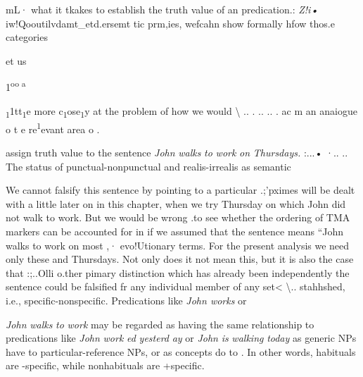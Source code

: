 mL· what it tkakes to establish the truth value of an  predication.: \textit{Z}\textit{!i•} iw!Qooutilvdamt\_etd.ersemt tic prm,ies, wefcahn show formally hfow thos.e categories

et us

1\textsuperscript{oo a}

\textsubscript{1}1tt\textsubscript{1}e more c\textsubscript{1}ose\textsubscript{1}y at the problem of how we would {\textbackslash} .. . .. .. . ac m an anaiogue o t e re\textsuperscript{1}evant area o .

assign truth value to the sentence \textit{John} \textit{wal}\textit{k}\textit{s} \textit{to} \textit{work} \textit{on} \textit{Thursdays. }:...• ·.. .. The status of punctual-nonpunctual and realis-irrealis as semantic

We cannot falsify this sentence by pointing to a particular .;'pximes will be dealt with a little later on in this chapter, when we try Thursday on which John did not walk to work. But we would be wrong .to see whether the ordering of TMA markers can be accounted for in if we assumed that the sentence means ``John walks to work on most ,· evo!Utionary terms. For the present analysis we need only these and Thursdays. Not only does it not mean this, but it is also the case that  :;..Olli o.ther pimary distinction which has already been independently the sentence could be falsified fr any individual member of any set{\textless} {\textbackslash}.. stahhshed, i.e., specific-nonspecific. Predications like \textit{John works }or

  


 


\textit{John} \textit{walks} \textit{to} \textit{work }may be regarded as having the same relationship to predications like \textit{John} \textit{work} \textit{ed} \textit{yesterd} \textit{ay} or \textit{John} \textit{is} \textit{walking} \textit{today} as generic NPs have to particular-reference NPs, or as concepts do to . In other words, habituals are {}-specific, while nonhabituals are +specific.

